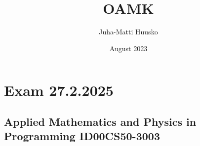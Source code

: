 \documentclass[12pt]{article}
\title{OAMK}
\author{Juha-Matti Huusko}
\date{August 2023}
\begin{document}
\thispagestyle{empty}

\section*{Exam 27.2.2025}
\subsection*{Applied Mathematics and Physics in Programming ID00CS50-3003}
\end{document}
